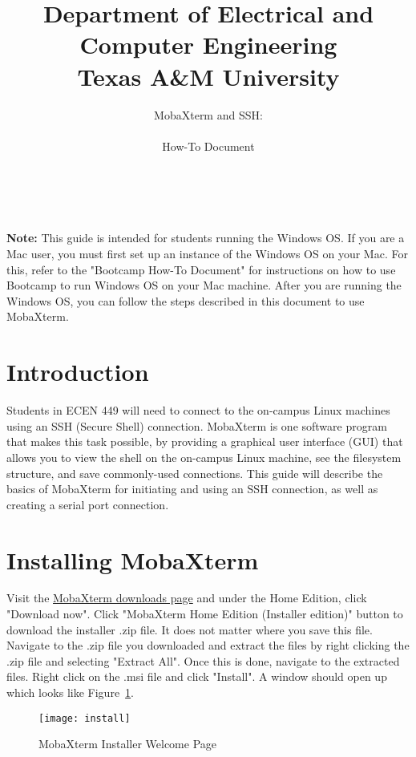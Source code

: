 \documentclass[11pt,twoside,titlepage]{article}
\title{ \huge Department of Electrical and Computer Engineering\\ \huge Texas A\&M University \\}
\author{ \huge MobaXterm and SSH:\\ \\ \huge How-To Document \\ \\ \\ \ta}
\date{}
\begin{document}

\maketitle

\noindent
\textbf{Note:} This guide is intended for students running the Windows OS. If you are a Mac user, you must first set up an instance of the Windows OS on your Mac. For this, refer to the "Bootcamp How-To Document" for instructions on how to use Bootcamp to run Windows OS on your Mac machine. After you are running the Windows OS, you can follow the steps described in this document to use MobaXterm.\\

\section{Introduction}
Students in ECEN 449 will need to connect to the on-campus Linux machines using an SSH (Secure Shell) connection. MobaXterm is one software program that makes this task possible, by providing a graphical user interface (GUI) that allows you to view the shell on the on-campus Linux machine, see the filesystem structure, and save commonly-used connections. This guide will describe the basics of MobaXterm for initiating and using an SSH connection, as well as creating a serial port connection.\\

\section{Installing MobaXterm}

\noindent
Visit the \href{https://mobaxterm.mobatek.net/download.html}{MobaXterm downloads page} and under the Home Edition, click "Download now". Click "MobaXterm Home Edition (Installer edition)" button to download the installer .zip file. It does not matter where you save this file.\\

\noindent
Navigate to the .zip file you downloaded and extract the files by right clicking the .zip file and selecting "Extract All". Once this is done, navigate to the extracted files. Right click on the .msi file and click "Install". A window should open up which looks like Figure~\ref{install}.\\

\begin{figure}[!h]
	\centering 
	\texttt{[image: install]}
	\caption{MobaXterm Installer Welcome Page}
	\label{install}
\end{figure}
\end{document}
